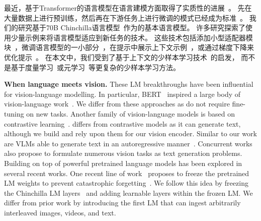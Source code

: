 最近，基于Transformer的语言模型在语言建模方面取得了实质性的进展~\citep{vaswani2017attention}。 先在大量数据上进行预训练，然后再在下游任务上进行微调的模式已经成为标准~\citep{mikolov2010recurrent,graves2013generating,jozefowicz2016exploring,howard2018universal,bert,t5,sutskever2011generating,gpt3}。 我们的研究基于70B Chinchilla语言模型~\citep{chinchilla}作为\largem{}的基本语言模型。 
许多研究探索了使用少量示例来将语言模型适应到新任务的技术。 这些技术包括添加小型适配器模块~\citep{houlsby2019parameter}，微调语言模型的一小部分~\citep{zaken_bitfit_2022}，在提示中展示上下文示例~\citep{gpt3}，或通过梯度下降来优化提示~\citep{li2021prefix,lester2021power}。 在本文中，我们受到了基于上下文的少样本学习技术~\citep{gpt3}的启发，
而不是基于度量学习~\citep{doersch2020crosstransformers,vinyals2016matching,snell2017prototypical,tian2020rethinking}或元学习~\citep{finn2017model,bertinetto2018meta,zintgraf2019fast,requeima2019fast,gordon2018meta,bertinetto2016learning}等更复杂的少样本学习方法。

\textbf{When language meets vision.}
These LM breakthroughs have been influential for vision-language modelling.
In particular, BERT~\citep{bert} inspired a large body of vision-language work~\citep{lu2019vilbert,su2019vl,chen2020uniter,hendricks2021decoupling,wang2021vlmo,li2020oscar,tan2019lxmert,zhu2020actbert,wang2021ufo,li2020hero,gan2020large,fu2021violet,zellers2021merlot,zellers2022merlot,singh2021flava,sun2019videobert}.
We differ from these approaches as \methodfamily{} do not require fine-tuning on new tasks.
Another family of vision-language models is based on contrastive learning~\citep{alayrac2020self,clip,align,zhai2021lit,pham2021combined,miech2020end,bain2021frozen,yuan2021florence,li2021align,yao2021filip,jain2021mural}.
\method{} differs from contrastive models as it can generate text,
although we build and rely upon them for our vision encoder.
Similar to our work are VLMs able to generate text in an autoregressive manner~\citep{vinyals2015show,donahue2015long,luo2020univl,hu2021scaling,dai2022}.
Concurrent works~\citep{wang2021simvlm,cho2021unifying,wang2022unifying,zhu2021uni,li2022blip} also propose to formulate numerous vision tasks as text generation problems.
Building on top of powerful pretrained language models has been explored in several recent works.
One recent line of work~\citep{tsimpoukelli2021multimodal,eichenberg2021magma,mokady2021clipcap,luo2022vc,yang2021empirical,zeng2022socraticmodels} proposes to freeze the pretrained LM weights to prevent catastrophic forgetting~\citep{mccloskey1989catastrophic}.
We follow this idea by freezing the Chinchilla LM layers~\citep{chinchilla} and adding learnable layers within the frozen LM.
We differ from prior work by introducing the first LM that can ingest arbitrarily interleaved images, videos, and text.

